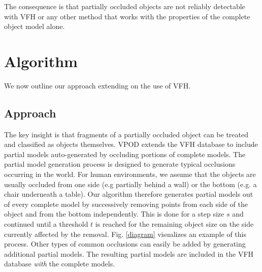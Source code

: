 \documentclass[letterpaper, 10pt, conference]{ieeeconf}
\begin{document}
The consequence is that partially occluded objects are not reliably detectable
with VFH or any other method that works with the properties of the complete
object model alone.




\section{Algorithm}
\label{analyis}

We now outline our approach extending on the use of VFH. 
\subsection{Approach}
The key insight is that fragments of a partially occluded object can be treated
and classified as objects themselves. 
VPOD extends the VFH database to include partial models auto-generated by
occluding portions of complete models. The partial model generation process is
designed to generate typical occlusions occurring in the world. For human environments, we assume that the objects are usually occluded from one side (e.g partially behind a wall) 
or the bottom (e.g. a chair underneath a table). Our algorithm therefore
generates partial models out of every complete model by successively removing
points from each side of the object and from the bottom independently. This is done for a step size $s$ and continued until a threshold $t$ is reached for the remaining 
object size on the side currently affected by the removal. Fig. \ref{diagram}
visualizes an example of this process. Other types of common occlusions can
easily be added by generating additional partial models. The resulting partial models are 
included in the VFH database \emph{with} the complete models.
\end{document}
